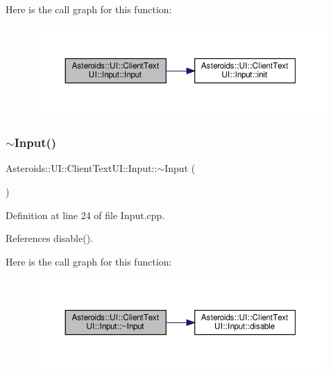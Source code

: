 Here is the call graph for this function\+:\nopagebreak
\begin{figure}[H]
\begin{center}
\leavevmode
\includegraphics[width=350pt]{classAsteroids_1_1UI_1_1ClientTextUI_1_1Input_aef07e99edf7199b0d89c185fbac19418_cgraph}
\end{center}
\end{figure}
\mbox{\label{classAsteroids_1_1UI_1_1ClientTextUI_1_1Input_aa7c479159f14b8f97a39ed355d934be2}} 
\subsubsection{\texorpdfstring{$\sim$\+Input()}{~Input()}}
{\footnotesize\ttfamily Asteroids\+::\+U\+I\+::\+Client\+Text\+U\+I\+::\+Input\+::$\sim$\+Input (\begin{DoxyParamCaption}{ }\end{DoxyParamCaption})}



Definition at line 24 of file Input.\+cpp.



References disable().

Here is the call graph for this function\+:\nopagebreak
\begin{figure}[H]
\begin{center}
\leavevmode
\includegraphics[width=350pt]{classAsteroids_1_1UI_1_1ClientTextUI_1_1Input_aa7c479159f14b8f97a39ed355d934be2_cgraph}
\end{center}
\end{figure}


